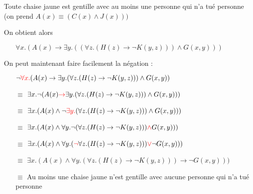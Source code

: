\begin{frame}

Toute chaise jaune est gentille avec au moins une personne qui n'a tué personne (on prend $A(x) \equiv (C(x) \wedge J(x)))$\newline

On obtient alors 

\begin{itemize}
\item[] $\forall x. (A(x) \rightarrow \exists y. ((\forall z. (H(z) \rightarrow \neg K(y,z))) \wedge G(x,y)))$\pause
\end{itemize}

On peut maintenant faire facilement la négation :
\begin{itemize}
\item[] $\neg \textcolor{red}{\forall x.}  (A(x) \rightarrow \exists y. (\forall z. (H(z) \rightarrow \neg K(y,z))) \wedge G(x,y))$\pause
\item[$\equiv$] $ \exists x. \neg (A(x) \textcolor{red}{\rightarrow} \exists y. (\forall z. (H(z) \rightarrow \neg K(y,z))) \wedge G(x,y)))$\pause
\item[$\equiv$] $ \exists x. (A(x) \wedge \neg \textcolor{red}{\exists y.} (\forall z. (H(z) \rightarrow \neg K(y,z))) \wedge G(x,y)))$\pause
\item[$\equiv$] $ \exists x. (A(x) \wedge \forall y. \neg (\forall z. (H(z) \rightarrow \neg K(y,z))) \textcolor{red}{\wedge} G(x,y)))$\pause
\item[$\equiv$] $ \exists x. (A(x) \wedge \forall y. (\textcolor{red}{\neg} \forall z. (H(z) \rightarrow \neg K(y,z))) \textcolor{red}{\vee} \neg G(x,y)))$\pause
\item[$\equiv$] $ \exists x. (A(x) \wedge \forall y. (\forall z. (H(z) \rightarrow \neg K(y,z))) \rightarrow \neg G(x,y)))$\pause
\item[$\equiv$] Au moins une chaise jaune n'est gentille avec aucune personne qui n'a tué personne
\end{itemize}
\end{frame}



	
	
